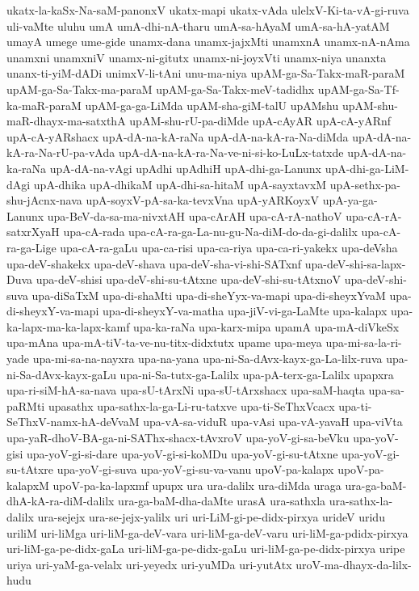 {ukatx-la-kaSx-Na-saM-panonxV
ukatx-mapi
ukatx-vAda
ulelxV-Ki-ta-vA-gi-ruva
uli-vaMte
uluhu
umA
umA-dhi-nA-tharu
umA-sa-hAyaM
umA-sa-hA-yatAM
umayA
umege
ume-gide
unamx-dana
unamx-jajxMti
unamxnA
unamx-nA-nAma
unamxni
unamxniV
unamx-ni-gitutx
unamx-ni-joyxVti
unamx-niya
unanxta
unanx-ti-yiM-dADi
unimxV-li-tAni
unu-ma-niya
upAM-ga-Sa-Takx-maR-paraM
upAM-ga-Sa-Takx-ma-paraM
upAM-ga-Sa-Takx-meV-tadidhx
upAM-ga-Sa-Tf-ka-maR-paraM
upAM-ga-ga-LiMda
upAM-sha-giM-talU
upAMshu
upAM-shu-maR-dhayx-ma-satxthA
upAM-shu-rU-pa-diMde
upA-cAyAR
upA-cA-yARnf
upA-cA-yARshacx
upA-dA-na-kA-raNa
upA-dA-na-kA-ra-Na-diMda
upA-dA-na-kA-ra-Na-rU-pa-vAda
upA-dA-na-kA-ra-Na-ve-ni-si-ko-LuLx-tatxde
upA-dA-na-ka-raNa
upA-dA-na-vAgi
upAdhi
upAdhiH
upA-dhi-ga-Lanunx
upA-dhi-ga-LiM-dAgi
upA-dhika
upA-dhikaM
upA-dhi-sa-hitaM
upA-sayxtavxM
upA-sethx-pa-shu-jAcnx-nava
upA-soyxV-pA-sa-ka-tevxVna
upA-yARKoyxV
upA-ya-ga-Lanunx
upa-BeV-da-sa-ma-nivxtAH
upa-cArAH
upa-cA-rA-nathoV
upa-cA-rA-satxrXyaH
upa-cA-rada
upa-cA-ra-ga-La-nu-gu-Na-diM-do-da-gi-dalilx
upa-cA-ra-ga-Lige
upa-cA-ra-gaLu
upa-ca-risi
upa-ca-riya
upa-ca-ri-yakekx
upa-deVsha
upa-deV-shakekx
upa-deV-shava
upa-deV-sha-vi-shi-SATxnf
upa-deV-shi-sa-lapx-Duva
upa-deV-shisi
upa-deV-shi-su-tAtxne
upa-deV-shi-su-tAtxnoV
upa-deV-shi-suva
upa-diSaTxM
upa-di-shaMti
upa-di-sheYyx-va-mapi
upa-di-sheyxYvaM
upa-di-sheyxY-va-mapi
upa-di-sheyxY-va-matha
upa-jiV-vi-ga-LaMte
upa-kalapx
upa-ka-lapx-ma-ka-lapx-kamf
upa-ka-raNa
upa-karx-mipa
upamA
upa-mA-diVkeSx
upa-mAna
upa-mA-tiV-ta-ve-nu-titx-didxtutx
upame
upa-meya
upa-mi-sa-la-ri-yade
upa-mi-sa-na-nayxra
upa-na-yana
upa-ni-Sa-dAvx-kayx-ga-La-lilx-ruva
upa-ni-Sa-dAvx-kayx-gaLu
upa-ni-Sa-tutx-ga-Lalilx
upa-pA-terx-ga-Lalilx
upapxra
upa-ri-siM-hA-sa-nava
upa-sU-tArxNi
upa-sU-tArxshacx
upa-saM-haqta
upa-sa-paRMti
upasathx
upa-sathx-la-ga-Li-ru-tatxve
upa-ti-SeThxVcacx
upa-ti-SeThxV-namx-hA-deVvaM
upa-vA-sa-viduR
upa-vAsi
upa-vA-yavaH
upa-viVta
upa-yaR-dhoV-BA-ga-ni-SAThx-shacx-tAvxroV
upa-yoV-gi-sa-beVku
upa-yoV-gisi
upa-yoV-gi-si-dare
upa-yoV-gi-si-koMDu
upa-yoV-gi-su-tAtxne
upa-yoV-gi-su-tAtxre
upa-yoV-gi-suva
upa-yoV-gi-su-va-vanu
upoV-pa-kalapx
upoV-pa-kalapxM
upoV-pa-ka-lapxmf
upupx
ura
ura-dalilx
ura-diMda
uraga
ura-ga-baM-dhA-kA-ra-diM-dalilx
ura-ga-baM-dha-daMte
urasA
ura-sathxla
ura-sathx-la-dalilx
ura-sejejx
ura-se-jejx-yalilx
uri
uri-LiM-gi-pe-didx-pirxya
urideV
uridu
uriliM
uri-liMga
uri-liM-ga-deV-vara
uri-liM-ga-deV-varu
uri-liM-ga-pdidx-pirxya
uri-liM-ga-pe-didx-gaLa
uri-liM-ga-pe-didx-gaLu
uri-liM-ga-pe-didx-pirxya
uripe
uriya
uri-yaM-ga-velalx
uri-yeyedx
uri-yuMDa
uri-yutAtx
uroV-ma-dhayx-da-lilx-hudu
}
